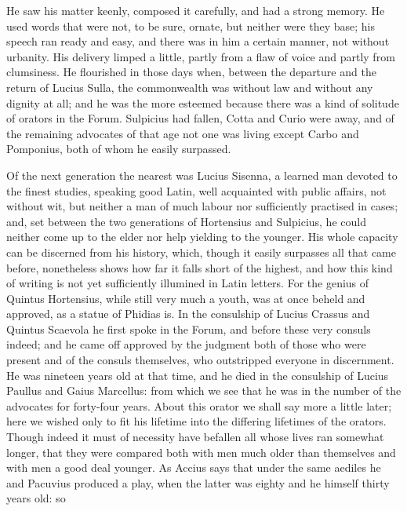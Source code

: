  He saw his matter keenly, composed it carefully, and had a strong memory. He used words that were not, to be sure, ornate, but neither were they base; his speech ran ready and easy, and there was in him a certain manner, not without urbanity. His delivery limped a little, partly from a flaw of voice and partly from clumsiness. He flourished in those days when, between the departure and the return of Lucius Sulla, the commonwealth was without law and without any dignity at all; and he was the more esteemed because there was a kind of solitude of orators in the Forum. Sulpicius had fallen, Cotta and Curio were away, and of the remaining advocates of that age not one was living except Carbo and Pomponius, both of whom he easily surpassed.

 Of the next generation the nearest was Lucius Sisenna, a learned man devoted to the finest studies, speaking good Latin, well acquainted with public affairs, not without wit, but neither a man of much labour nor sufficiently practised in cases; and, set between the two generations of Hortensius and Sulpicius, he could neither come up to the elder nor help yielding to the younger. His whole capacity can be discerned from his history, which, though it easily surpasses all that came before, nonetheless shows how far it falls short of the highest, and how this kind of writing is not yet sufficiently illumined in Latin letters. For the genius of Quintus Hortensius, while still very much a youth, was at once beheld and approved, as a statue of Phidias is. In the consulship of Lucius Crassus and Quintus Scaevola he first spoke in the Forum, and before these very consuls indeed; and he came off approved by the judgment both of those who were present and of the consuls themselves, who outstripped everyone in discernment. He was nineteen years old at that time, and he died in the consulship of Lucius Paullus and Gaius Marcellus: from which we see that he was in the number of the advocates for forty-four years. About this orator we shall say more a little later; here we wished only to fit his lifetime into the differing lifetimes of the orators. Though indeed it must of necessity have befallen all whose lives ran somewhat longer, that they were compared both with men much older than themselves and with men a good deal younger. As Accius says that under the same aediles he and Pacuvius produced a play, when the latter was eighty and he himself thirty years old: so

